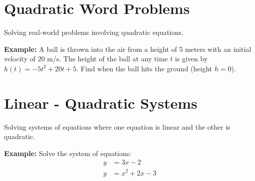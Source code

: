 \documentclass{article}
\begin{document}
\section{Quadratic Word Problems}
Solving real-world problems involving quadratic equations.

\textbf{Example:}
A ball is thrown into the air from a height of 5 meters with an initial velocity of 20 m/s. The height of the ball at any time $t$ is given by $h(t) = -5t^2 + 20t + 5$. Find when the ball hits the ground (height $h = 0$).

\section{Linear - Quadratic Systems}
Solving systems of equations where one equation is linear and the other is quadratic.

\textbf{Example:}
Solve the system of equations:
\begin{align*}
  y &= 3x - 2 \\
  y &= x^2 + 2x - 3
\end{align*}
\end{document}
